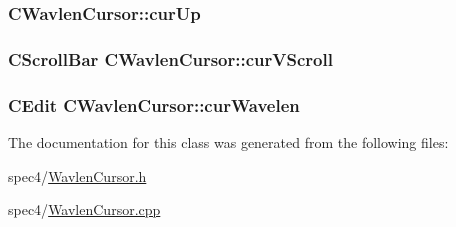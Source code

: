 \label{classCWavlenCursor_ae95d7b3ced6a60f010c27856af2d81e9}
\hypertarget{classCWavlenCursor_ac14f5bebc91fcd3a4eeb7f12549013dd}{
\subsubsection[{curUp}]{ {\bf CWavlenCursor::curUp}}}
\label{classCWavlenCursor_ac14f5bebc91fcd3a4eeb7f12549013dd}
\hypertarget{classCWavlenCursor_a1f0ee0280cfb1b6ce28ab4b9b009ac75}{
\subsubsection[{curVScroll}]{\setlength{\rightskip}{0pt plus 5cm}CScrollBar {\bf CWavlenCursor::curVScroll}}}
\label{classCWavlenCursor_a1f0ee0280cfb1b6ce28ab4b9b009ac75}
\hypertarget{classCWavlenCursor_a0552c4999c0c89d78b08df094110cbc5}{
\subsubsection[{curWavelen}]{\setlength{\rightskip}{0pt plus 5cm}CEdit {\bf CWavlenCursor::curWavelen}}}
\label{classCWavlenCursor_a0552c4999c0c89d78b08df094110cbc5}


The documentation for this class was generated from the following files:\begin{DoxyCompactItemize}
\item 
spec4/\hyperlink{WavlenCursor_8h}{WavlenCursor.h}\item 
spec4/\hyperlink{WavlenCursor_8cpp}{WavlenCursor.cpp}\end{DoxyCompactItemize}

